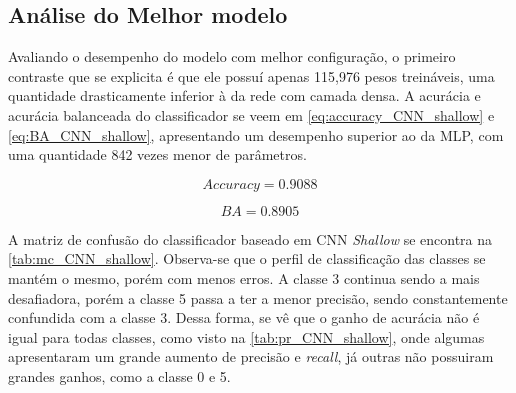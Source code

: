 \subsection{Análise do Melhor modelo}

	Avaliando o desempenho do modelo com melhor configuração, o primeiro contraste que se explicita é que ele possuí apenas 115,976 pesos treináveis, uma quantidade drasticamente inferior à da rede com camada densa. A acurácia e acurácia balanceada do classificador se veem em \eqref{eq:accuracy_CNN_shallow} e \eqref{eq:BA_CNN_shallow}, apresentando um desempenho superior ao da MLP, com uma quantidade 842 vezes menor de parâmetros.

\begin{equation}\label{eq:accuracy_CNN_shallow}
	Accuracy = 0.9088
\end{equation}

\begin{equation}\label{eq:BA_CNN_shallow}
	BA = 0.8905
\end{equation}

A matriz de confusão do classificador baseado em CNN \textit{Shallow} se encontra na \autoref{tab:mc_CNN_shallow}. Observa-se que o perfil de classificação das classes se mantém o mesmo, porém com menos erros. A classe 3  continua sendo a mais desafiadora, porém a classe 5 passa a ter a menor precisão, sendo constantemente confundida com a classe 3. Dessa forma, se vê que o ganho de acurácia não é igual para todas classes, como visto na \autoref{tab:pr_CNN_shallow}, onde algumas apresentaram um grande aumento de precisão e \textit{recall}, já outras não possuiram grandes ganhos, como a classe 0 e 5.



